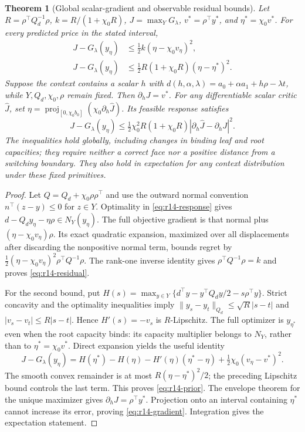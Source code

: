 \documentclass[11pt,letterpaper]{article}
\newtheorem{theorem}{Theorem}[section]
\theoremstyle{definition}
\newcommand{\1}{\mathbf 1}
\begin{document}
\begin{theorem}[Global scalar-gradient and observable residual bounds]\label{thm:r14-gradient}
Let $R=\rho^\top Q_d^{-1}\rho$, $k=R/(1+\chi_0R)$, $J=\max_YG_\lambda$, $v^*=\rho^\top y^*$, and $\eta^*=\chi_0v^*$. For every predicted price in the stated interval,
\begin{align}
 J-G_\lambda(y_\eta)&\leq \tfrac12 k(\eta-\chi_0v_\eta)^2,\label{eq:r14-residual}\\
 J-G_\lambda(y_\eta)&\leq \tfrac12 R(1+\chi_0R)(\eta-\eta^*)^2.\label{eq:r14-prior}
\end{align}
Suppose the context contains a scalar $h$ with $d(h,\alpha,\lambda)=a_0+\alpha a_1+h\rho-\lambda t$, while $Y,Q_d,\chi_0,\rho$ remain fixed. Then $\partial_hJ=v^*$. For any differentiable scalar critic $\widehat J$, set
$\eta=\operatorname{proj}_{[0,\chi_0b_0]}(\chi_0\partial_h\widehat J)$. Its feasible response satisfies
\begin{equation}\label{eq:r14-gradient}
 J-G_\lambda(y_\eta)\leq
 \tfrac12\chi_0^2R(1+\chi_0R)|\partial_h\widehat J-\partial_hJ|^2.
\end{equation}
The inequalities hold globally, including changes in binding leaf and root capacities; they require neither a correct face nor a positive distance from a switching boundary. They also hold in expectation for any context distribution under these fixed primitives.
\end{theorem}
\begin{proof}
Let $Q=Q_d+\chi_0\rho\rho^\top$ and use the outward normal convention $n^\top(z-y)\leq0$ for $z\in Y$. Optimality in \eqref{eq:r14-response} gives $d-Q_dy_\eta-\eta\rho\in N_Y(y_\eta)$. The full objective gradient is that normal plus $(\eta-\chi_0v_\eta)\rho$. Its exact quadratic expansion, maximized over all displacements after discarding the nonpositive normal term, bounds regret by
$\tfrac12(\eta-\chi_0v_\eta)^2\rho^\top Q^{-1}\rho$.
The rank-one inverse identity gives $\rho^\top Q^{-1}\rho=k$ and proves \eqref{eq:r14-residual}.

For the second bound, put $H(s)=\max_{y\in Y}\{d^\top y-y^\top Q_dy/2-s\rho^\top y\}$. Strict concavity and the optimality inequalities imply
$\|y_s-y_t\|_{Q_d}\leq\sqrt R|s-t|$ and $|v_s-v_t|\leq R|s-t|$. Hence $H'(s)=-v_s$ is $R$-Lipschitz. The full optimizer is $y_{\eta^*}$ even when the root capacity binds: its capacity multiplier belongs to $N_Y$, rather than to $\eta^*=\chi_0v^*$. Direct expansion yields the useful identity
\[
 J-G_\lambda(y_\eta)=H(\eta^*)-H(\eta)-H'(\eta)(\eta^*-\eta)
                  +\tfrac12\chi_0(v_\eta-v^*)^2.
\]
The smooth convex remainder is at most $R(\eta-\eta^*)^2/2$; the preceding Lipschitz bound controls the last term. This proves \eqref{eq:r14-prior}. The envelope theorem for the unique maximizer gives $\partial_hJ=\rho^\top y^*$. Projection onto an interval containing $\eta^*$ cannot increase its error, proving \eqref{eq:r14-gradient}. Integration gives the expectation statement.
\end{proof}
\end{document}
